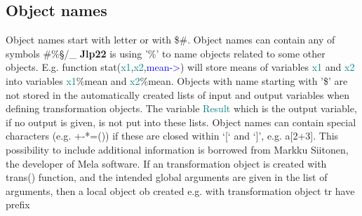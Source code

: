 \subsection{Object names} 
\label{onames} 
Object names start with letter or with {\$\#}. Object names can contain any of 
symbols {\#\%§/\_} \textbf{Jlp22} is using '\%' to name objects related to some other objects. 
E.g. function \textcolor{VioletRed}{stat}(\textcolor{teal}{x1},\textcolor{teal}{x2},\textcolor{blue}{mean->}) will store means of variables \textcolor{teal}{x1} and \textcolor{teal}{x2} into 
variables \textcolor{teal}{x1}\%mean and \textcolor{teal}{x2}\%mean. Objects with name starting with '\$' are not 
stored in the automatically created lists of input and output variables when 
defining transformation objects. The variable \textcolor{teal}{Result} which 
is the output variable, if no output is given, is not put into these lists. 
Object names can contain special characters (e.g. +-*=()) if these are closed 
within ‘[‘ and ‘]’, e.g. a[2+3]. This possibility to include additional information 
is borrowed from Markku Siitonen, the developer of Mela software. 
If an transformation object is created with \textcolor{VioletRed}{trans}() function, and the 
intended global arguments are given in the list of arguments, 
then a  local object {ob} created e.g. with transformation object {tr} have prefix 
